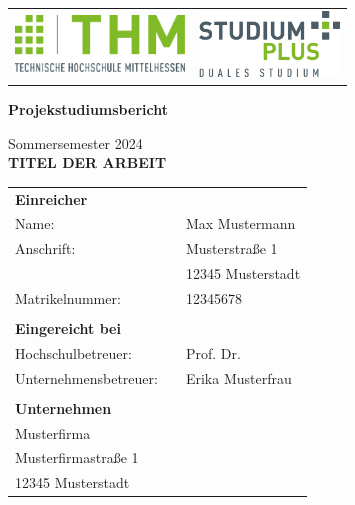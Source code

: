 \begin{titlepage}
    \begin{tabularx}{1\textwidth}{Xr}
        \includegraphics[height=1.5cm]{functional-pages/figures/thm-thm.pdf} & \includegraphics[height=1.75cm]{functional-pages/figures/thm-studiumplus.pdf} \\
    \end{tabularx}

    \vspace{15mm} %

    \begin{center}
        \large
        \textbf{Projekstudiumsbericht}
        \large

        Sommersemester 2024\\
        \vspace{15mm}
        \textbf{TITEL DER ARBEIT}
    \end{center}

    \vspace*{\fill} %

    \begin{center}
        \begin{tabular}{ p{5cm} l l }
            \textbf{Einreicher} & &\\
            Name: & & Max Mustermann\\
            Anschrift: & & Musterstraße 1\\
            & & 12345 Musterstadt\\
            Matrikelnummer: & & 12345678\\
            \tabularnewline
            \textbf{Eingereicht bei} & &\\
            Hochschulbetreuer: & & Prof. Dr. \\
            Unternehmensbetreuer: & & Erika Musterfrau\\
            \tabularnewline
            \textbf{Unternehmen} & &\\
            \multicolumn{3}{l}{Musterfirma}\\
            \multicolumn{3}{l}{Musterfirmastraße 1}\\
            \multicolumn{3}{l}{12345 Musterstadt}
        \end{tabular}


\end{center}
\end{titlepage}
